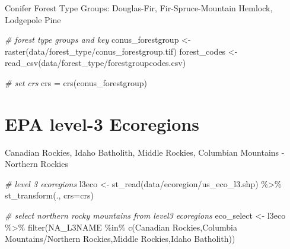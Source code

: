 \documentclass[
]{book}
\newenvironment{Shaded}{\begin{snugshade}}{\end{snugshade}}
\newcommand{\AttributeTok}[1]{\textcolor[rgb]{0.77,0.63,0.00}{#1}}
\newcommand{\CommentTok}[1]{\textcolor[rgb]{0.56,0.35,0.01}{\textit{#1}}}
\newcommand{\FunctionTok}[1]{\textcolor[rgb]{0.00,0.00,0.00}{#1}}
\newcommand{\NormalTok}[1]{#1}
\newcommand{\OtherTok}[1]{\textcolor[rgb]{0.56,0.35,0.01}{#1}}
\newcommand{\SpecialCharTok}[1]{\textcolor[rgb]{0.00,0.00,0.00}{#1}}
\newcommand{\StringTok}[1]{\textcolor[rgb]{0.31,0.60,0.02}{#1}}
\begin{document}
Conifer Forest Type Groups: Douglas-Fir, Fir-Spruce-Mountain Hemlock, Lodgepole Pine

\begin{Shaded}
\begin{Highlighting}[]
\CommentTok{\# forest type groups and key}
\NormalTok{conus\_forestgroup }\OtherTok{\textless{}{-}} \FunctionTok{raster}\NormalTok{(}\StringTok{\textquotesingle{}data/forest\_type/conus\_forestgroup.tif\textquotesingle{}}\NormalTok{)}
\NormalTok{forest\_codes }\OtherTok{\textless{}{-}} \FunctionTok{read\_csv}\NormalTok{(}\StringTok{\textquotesingle{}data/forest\_type/forestgroupcodes.csv\textquotesingle{}}\NormalTok{)}

\CommentTok{\# set crs}
\NormalTok{crs }\OtherTok{=} \FunctionTok{crs}\NormalTok{(conus\_forestgroup)}
\end{Highlighting}
\end{Shaded}

\hypertarget{epa-level-3-ecoregions}{%
\section{EPA level-3 Ecoregions}\label{epa-level-3-ecoregions}}

Canadian Rockies, Idaho Batholith, Middle Rockies, Columbian Mountains - Northern Rockies

\begin{Shaded}
\begin{Highlighting}[]
\CommentTok{\# level 3 ecoregions}
\NormalTok{l3eco }\OtherTok{\textless{}{-}} \FunctionTok{st\_read}\NormalTok{(}\StringTok{\textquotesingle{}data/ecoregion/us\_eco\_l3.shp\textquotesingle{}}\NormalTok{) }\SpecialCharTok{\%\textgreater{}\%} 
  \FunctionTok{st\_transform}\NormalTok{(., }\AttributeTok{crs=}\NormalTok{crs)}

\CommentTok{\# select northern rocky mountains from level3 ecoregions}
\NormalTok{eco\_select }\OtherTok{\textless{}{-}}\NormalTok{ l3eco }\SpecialCharTok{\%\textgreater{}\%} 
  \FunctionTok{filter}\NormalTok{(NA\_L3NAME }\SpecialCharTok{\%in\%} \FunctionTok{c}\NormalTok{(}\StringTok{\textquotesingle{}Canadian Rockies\textquotesingle{}}\NormalTok{,}\StringTok{\textquotesingle{}Columbia Mountains/Northern Rockies\textquotesingle{}}\NormalTok{,}\StringTok{\textquotesingle{}Middle Rockies\textquotesingle{}}\NormalTok{,}\StringTok{\textquotesingle{}Idaho Batholith\textquotesingle{}}\NormalTok{))}
\end{Highlighting}
\end{Shaded}
\end{document}
